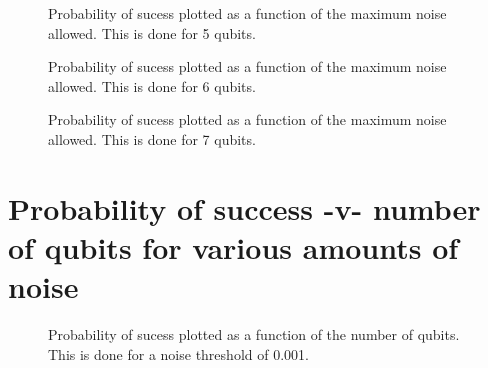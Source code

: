 \pagebreak

\begin{figure}[h]
\begin{center}
\end{center}
\caption{Probability of sucess plotted as a function of the maximum noise allowed.
This is done for 5 qubits.}
\end{figure}

\pagebreak

\begin{figure}[h]
\begin{center}
\end{center}
\caption{Probability of sucess plotted as a function of the maximum noise allowed.
This is done for 6 qubits.}
\end{figure}

\pagebreak

\begin{figure}[h]
\begin{center}
\end{center}
\caption{Probability of sucess plotted as a function of the maximum noise allowed.
This is done for 7 qubits.}
\end{figure}

\pagebreak

\vfill
\section{Probability of success -v- number of qubits for various amounts of noise}
\vfill

\pagebreak


\begin{figure}[h]
\begin{center}
\end{center}
\caption{Probability of sucess plotted as a function of the number of qubits. This
is done for a noise threshold of 0.001.}
\end{figure}

